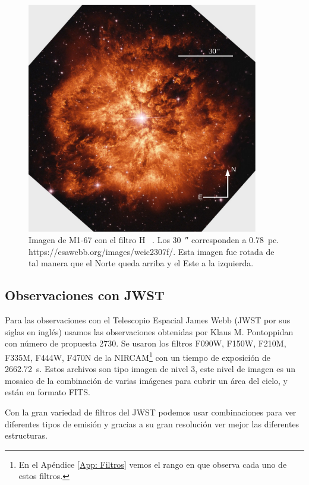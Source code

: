 \documentclass{book}
\begin{document}
\begin{figure}[htb]
    \centering
    \includegraphics[width=0.9\textwidth]{ultimas correcciones/WR124_HST.pdf}
    \caption{Imagen de M1-67 con el filtro \unit{H\alpha}
      \citep{Grosdidier:1998}. Los \SI{30}{\arcsecond} corresponden a
      \SI{0.78}{pc}. https://esawebb.org/images/weic2307f/. Esta
      imagen fue rotada de tal manera que el Norte queda arriba y el
      Este a la izquierda.}
    \label{fig:M1-67HST}
\end{figure}

\subsection{Observaciones con JWST}

Para las observaciones con el Telescopio Espacial James Webb (JWST por
sus siglas en inglés) usamos las observaciones obtenidas por Klaus M.
Pontoppidan con número de propuesta 2730. Se usaron los filtros F090W,
F150W, F210M, F335M, F444W, F470N de la NIRCAM\footnote{En el Apéndice
  \ref{App: Filtros} vemos el rango en que observa cada uno de estos
  filtros.} con un tiempo de exposición de \SI{2662.72}{s}. Estos
archivos son tipo imagen de nivel 3, este nivel de imagen es un
mosaico de la combinación de varias imágenes para cubrir un área del
cielo, y están en formato FITS.

Con la gran variedad de filtros del JWST podemos usar combinaciones
para ver diferentes tipos de emisión y gracias a su gran resolución
ver mejor las diferentes estructuras.
\end{document}
